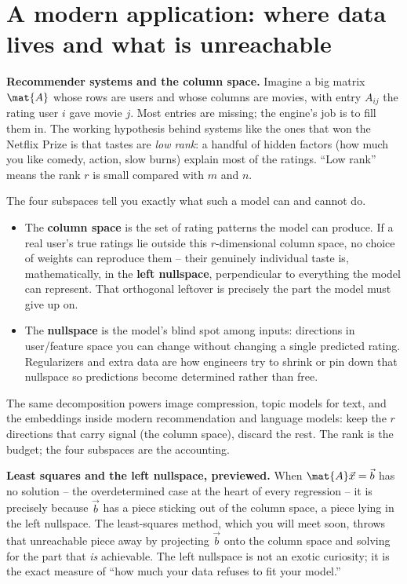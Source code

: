 \section{A modern application: where data lives and what is unreachable}

\begin{applicationbox}
\textbf{Recommender systems and the column space.} Imagine a big matrix $\mat{A}$ whose rows are
users and whose columns are movies, with entry $A_{ij}$ the rating user $i$ gave movie $j$. Most
entries are missing; the engine's job is to fill them in. The working hypothesis behind systems
like the ones that won the Netflix Prize is that tastes are \emph{low rank}: a handful of hidden
factors (how much you like comedy, action, slow burns) explain most of the ratings. ``Low rank''
means the rank $r$ is small compared with $m$ and $n$.

The four subspaces tell you exactly what such a model can and cannot do.
\begin{itemize}
  \item The \textbf{column space} is the set of rating patterns the model can produce. If a real
  user's true ratings lie outside this $r$-dimensional column space, no choice of weights can
  reproduce them -- their genuinely individual taste is, mathematically, in the
  \textbf{left nullspace}, perpendicular to everything the model can represent. That orthogonal
  leftover is precisely the part the model must give up on.
  \item The \textbf{nullspace} is the model's blind spot among inputs: directions in
  user/feature space you can change without changing a single predicted rating. Regularizers and
  extra data are how engineers try to shrink or pin down that nullspace so predictions become
  determined rather than free.
\end{itemize}
The same decomposition powers image compression, topic models for text, and the embeddings inside
modern recommendation and language models: keep the $r$ directions that carry signal (the column
space), discard the rest. The rank is the budget; the four subspaces are the accounting.
\end{applicationbox}

\begin{applicationbox}
\textbf{Least squares and the left nullspace, previewed.} When $\mat{A}\vec{x}=\vec{b}$ has no
solution -- the overdetermined case at the heart of every regression -- it is precisely because
$\vec{b}$ has a piece sticking out of the column space, a piece lying in the left nullspace. The
least-squares method, which you will meet soon, throws that unreachable piece away by projecting
$\vec{b}$ onto the column space and solving for the part that \emph{is} achievable. The left
nullspace is not an exotic curiosity; it is the exact measure of ``how much your data refuses to
fit your model.''
\end{applicationbox}

